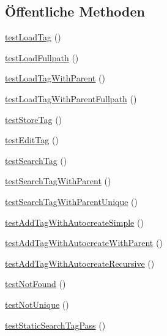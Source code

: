 \subsection*{Öffentliche Methoden}
\begin{DoxyCompactItemize}
\item 
\hyperlink{classTests_1_1Unit_1_1TagTest_a9b5d9ae5ad9de476aa1b5a6c83cf1d02}{test\+Load\+Tag} ()
\item 
\hyperlink{classTests_1_1Unit_1_1TagTest_aa4aadca1bf228ae2a898678bb7290ce3}{test\+Load\+Fullpath} ()
\item 
\hyperlink{classTests_1_1Unit_1_1TagTest_aed0f265dad414d6d4980bb4ee58d14a2}{test\+Load\+Tag\+With\+Parent} ()
\item 
\hyperlink{classTests_1_1Unit_1_1TagTest_ad0471111c5a135b29c5cc24becd4db63}{test\+Load\+Tag\+With\+Parent\+Fullpath} ()
\item 
\hyperlink{classTests_1_1Unit_1_1TagTest_a8edae443cbd67050d4f35a0023356f53}{test\+Store\+Tag} ()
\item 
\hyperlink{classTests_1_1Unit_1_1TagTest_a3fbfc3975f51b5eb95333c1b0e3e2481}{test\+Edit\+Tag} ()
\item 
\hyperlink{classTests_1_1Unit_1_1TagTest_aec2a0314eb9ed517877b25b94efec0bf}{test\+Search\+Tag} ()
\item 
\hyperlink{classTests_1_1Unit_1_1TagTest_aad33a4e57fa315ab04d40993beb8dc62}{test\+Search\+Tag\+With\+Parent} ()
\item 
\hyperlink{classTests_1_1Unit_1_1TagTest_a9c021b809c61227b43ba79d0066104c5}{test\+Search\+Tag\+With\+Parent\+Unique} ()
\item 
\hyperlink{classTests_1_1Unit_1_1TagTest_a8ef9ddafb4ae47d120c01b43a944b9aa}{test\+Add\+Tag\+With\+Autocreate\+Simple} ()
\item 
\hyperlink{classTests_1_1Unit_1_1TagTest_a7e6e9b1ec7f41cb9bcead95ae898d46d}{test\+Add\+Tag\+With\+Autocreate\+With\+Parent} ()
\item 
\hyperlink{classTests_1_1Unit_1_1TagTest_a51d919281f5aee326374349f8d050a14}{test\+Add\+Tag\+With\+Autocreate\+Recursive} ()
\item 
\hyperlink{classTests_1_1Unit_1_1TagTest_aa866b01724f7eb1fba972616d61e712d}{test\+Not\+Found} ()
\item 
\hyperlink{classTests_1_1Unit_1_1TagTest_a9d193fed612f8066eba5ea146b813447}{test\+Not\+Unique} ()
\item 
\hyperlink{classTests_1_1Unit_1_1TagTest_a56aa002efadf78756c4259e4d517008a}{test\+Static\+Search\+Tag\+Pass} ()
\item 

\end{DoxyCompactItemize}
